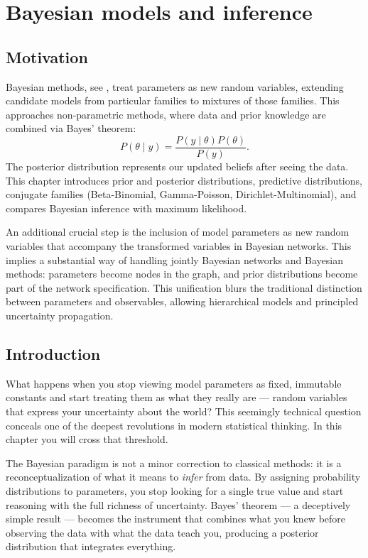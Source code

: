 \startcontents[chapter]
\chapter{Bayesian models and inference}\label{ch:bayesian_models}
\minitocboxed

\section*{Motivation}
Bayesian methods, see \cite{Gelman2004}, treat parameters as new random variables, extending candidate models from particular families to mixtures of those families. This approaches non-parametric methods, where data and prior knowledge are combined via Bayes' theorem:
\[
P(\theta\mid y)=\frac{P(y\mid\theta)P(\theta)}{P(y)}.
\]
The posterior distribution represents our updated beliefs after seeing the data. This chapter introduces prior and posterior distributions, predictive distributions, conjugate families (Beta-Binomial, Gamma-Poisson, Dirichlet-Multinomial), and compares Bayesian inference with maximum likelihood.

An additional crucial step is the inclusion of model parameters as new random variables that accompany the transformed variables in Bayesian networks. This implies a substantial way of handling jointly Bayesian networks and Bayesian methods: parameters become nodes in the graph, and prior distributions become part of the network specification. This unification blurs the traditional distinction between parameters and observables, allowing hierarchical models and principled uncertainty propagation.

\section{Introduction}

What happens when you stop viewing model parameters as fixed, immutable constants and start treating them as what they really are — random variables that express your uncertainty about the world? This seemingly technical question conceals one of the deepest revolutions in modern statistical thinking. In this chapter you will cross that threshold.

The Bayesian paradigm is not a minor correction to classical methods: it is a reconceptualization of what it means to \emph{infer} from data. By assigning probability distributions to parameters, you stop looking for a single true value and start reasoning with the full richness of uncertainty. Bayes' theorem — a deceptively simple result — becomes the instrument that combines what you knew before observing the data with what the data teach you, producing a posterior distribution that integrates everything.

